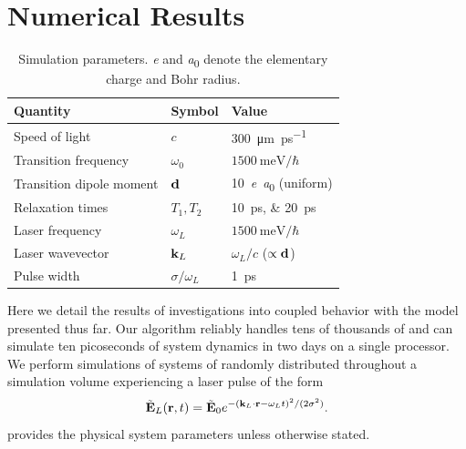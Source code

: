 \section{\label{section:results}Numerical Results}
\begin{table}
  \begin{ruledtabular}
    \begin{tabular}{lll}
      Quantity                 & Symbol            & Value                        \\ \hline
      Speed of light           & $c$               & \SI{300}{\micro\meter \per \pico\second} \\
      Transition frequency     & $\omega_0$        & $\SI{1500}{\milli\eV}/\hbar$ \\
      Transition dipole moment & $\vb{d}$          & \SI{10}{\elementarycharge\bohr} (uniform) \\
      Relaxation times         & $T_{1}, T_{2}$    & \SIlist{10;20}{\pico\second} \\
      Laser frequency          & $\omega_L$        & $\SI{1500}{\milli\eV}/\hbar$ \\
      Laser wavevector         & $\vb{k}_L$        & $\omega_L/c$ ($\propto \vb{d}$) \\
      Pulse width              & $\sigma/\omega_L$ & \SI{1}{\pico\second} \\
    \end{tabular}
  \end{ruledtabular}
  \caption{\label{table:parameters}Simulation parameters. \si{\elementarycharge} and \si{\bohr} denote the elementary charge and Bohr radius.}
\end{table}

Here we detail the results of investigations into coupled \qd{} behavior with the model presented thus far.
Our algorithm reliably handles tens of thousands of \qds{} and can simulate ten picoseconds of system dynamics in two days on a single processor.
We perform simulations of systems of \qds{} randomly distributed throughout a simulation volume experiencing a laser pulse of the form
\begin{equation}
  \tilde{\mathbf{E}}_L(\vb{r}, t) = \tilde{\mathbf{E}}_0 e^{-(\vb{k}_L \cdot \vb{r} - \omega_L t)^2/(2\sigma^2)}.
  \label{eq:pulse envelope}
\end{equation}
 provides the physical system parameters unless otherwise stated.


